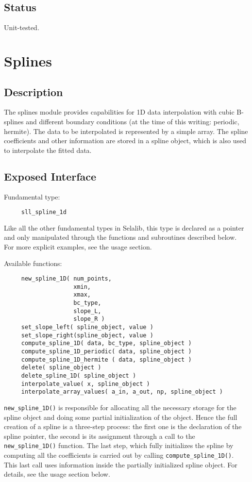 \documentclass[]{report}   %
\begin{document}
\subsection{Status}
Unit-tested.

\section{Splines}
\subsection{Description}
The splines module provides capabilities for 1D data interpolation with cubic B-splines and different boundary conditions (at the time of this writing: periodic, hermite). The data to be interpolated is represented by a simple array.  The spline coefficients and other information are stored in a spline object, which is also used to interpolate the fitted data.
\subsection{Exposed Interface}
Fundamental type:
\begin{verbatim}
     sll_spline_1d
\end{verbatim}
Like all the other fundamental types in Selalib, this type is declared as a pointer and only manipulated through the functions and subroutines described below. For more explicit examples, see the usage section.

Available functions:
\begin{verbatim}
     new_spline_1D( num_points, 
                    xmin, 
                    xmax, 
                    bc_type, 
                    slope_L, 
                    slope_R )  
     set_slope_left( spline_object, value )
     set_slope_right(spline_object, value )
     compute_spline_1D( data, bc_type, spline_object )
     compute_spline_1D_periodic( data, spline_object )
     compute_spline_1D_hermite ( data, spline_object )
     delete( spline_object )
     delete_spline_1D( spline_object )
     interpolate_value( x, spline_object )
     interpolate_array_values( a_in, a_out, np, spline_object )
\end{verbatim}
\verb+new_spline_1D()+ is responsible for allocating all the necessary storage for the spline object and doing some partial initialization of the object. Hence the full creation of a spline is a three-step process: the first one is the declaration of the spline pointer, the second is its assignment through a call to the \verb+new_spline_1D()+ function. The last step, which fully initializes the spline by computing all the coefficients is carried out by calling \verb+compute_spline_1D()+. This last call uses information inside the partially initialized spline object. For details, see the usage section below. 
\end{document}
